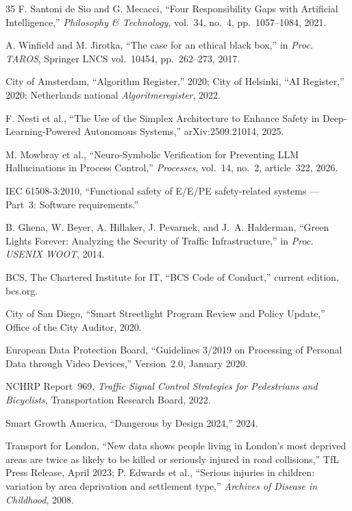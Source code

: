 \documentclass[sigconf,nonacm]{acmart}
\begin{document}
\begin{thebibliography}{35}
F. Santoni de Sio and G. Mecacci, ``Four Responsibility Gaps with Artificial Intelligence,'' \textit{Philosophy \& Technology}, vol.~34, no.~4, pp.~1057--1084, 2021.

A. Winfield and M. Jirotka, ``The case for an ethical black box,'' in \textit{Proc. TAROS}, Springer LNCS vol.~10454, pp.~262--273, 2017.

City of Amsterdam, ``Algorithm Register,'' 2020; City of Helsinki, ``AI Register,'' 2020; Netherlands national \textit{Algoritmeregister}, 2022.

F. Nesti et al., ``The Use of the Simplex Architecture to Enhance Safety in Deep-Learning-Powered Autonomous Systems,'' arXiv:2509.21014, 2025.

M. Mowbray et al., ``Neuro-Symbolic Verification for Preventing LLM Hallucinations in Process Control,'' \textit{Processes}, vol.~14, no.~2, article~322, 2026.

IEC 61508-3:2010, ``Functional safety of E/E/PE safety-related systems --- Part~3: Software requirements.''

B. Ghena, W. Beyer, A. Hillaker, J. Pevarnek, and J.~A. Halderman, ``Green Lights Forever: Analyzing the Security of Traffic Infrastructure,'' in \textit{Proc. USENIX WOOT}, 2014.

BCS, The Chartered Institute for IT, ``BCS Code of Conduct,'' current edition, bcs.org.

City of San Diego, ``Smart Streetlight Program Review and Policy Update,'' Office of the City Auditor, 2020.

European Data Protection Board, ``Guidelines 3/2019 on Processing of Personal Data through Video Devices,'' Version~2.0, January 2020.

NCHRP Report~969, \textit{Traffic Signal Control Strategies for Pedestrians and Bicyclists}, Transportation Research Board, 2022.

Smart Growth America, ``Dangerous by Design 2024,'' 2024.

Transport for London, ``New data shows people living in London's most deprived areas are twice as likely to be killed or seriously injured in road collisions,'' TfL Press Release, April 2023; P. Edwards et al., ``Serious injuries in children: variation by area deprivation and settlement type,'' \textit{Archives of Disease in Childhood}, 2008.


\end{thebibliography}
\end{document}
